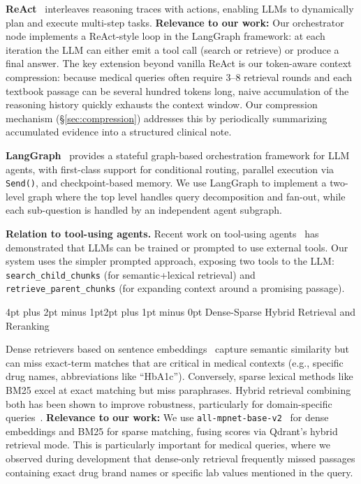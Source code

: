 \documentclass[10pt,twocolumn,letterpaper]{article}
\makeatletter
\renewcommand\subsection{\@startsection{subsection}{2}{\z@}%
  {4pt plus 2pt minus 1pt}{2pt plus 1pt minus 0pt}%
  {\normalsize\bfseries}}
\makeatother
\begin{document}
\textbf{ReAct}~\cite{yao2023react} interleaves reasoning traces with actions, enabling LLMs to dynamically plan and execute multi-step tasks. \textbf{Relevance to our work:} Our orchestrator node implements a ReAct-style loop in the LangGraph framework: at each iteration the LLM can either emit a tool call (search or retrieve) or produce a final answer. The key extension beyond vanilla ReAct is our token-aware context compression: because medical queries often require 3--8 retrieval rounds and each textbook passage can be several hundred tokens long, naive accumulation of the reasoning history quickly exhausts the context window. Our compression mechanism (\S\ref{sec:compression}) addresses this by periodically summarizing accumulated evidence into a structured clinical note.

\textbf{LangGraph}~\cite{langgraph} provides a stateful graph-based orchestration framework for LLM agents, with first-class support for conditional routing, parallel execution via \texttt{Send()}, and checkpoint-based memory. We use LangGraph to implement a two-level graph where the top level handles query decomposition and fan-out, while each sub-question is handled by an independent agent subgraph.

\textbf{Relation to tool-using agents.} Recent work on tool-using agents~\cite{schick2023toolformer,qin2023toolllm} has demonstrated that LLMs can be trained or prompted to use external tools. Our system uses the simpler prompted approach, exposing two tools to the LLM: \texttt{search\_child\_chunks} (for semantic+lexical retrieval) and \texttt{retrieve\_parent\_chunks} (for expanding context around a promising passage).

\subsection{Dense-Sparse Hybrid Retrieval and Reranking}

Dense retrievers based on sentence embeddings~\cite{reimers2019sentence,karpukhin2020dense} capture semantic similarity but can miss exact-term matches that are critical in medical contexts (e.g., specific drug names, abbreviations like ``HbA1c''). Conversely, sparse lexical methods like BM25 excel at exact matching but miss paraphrases. Hybrid retrieval combining both has been shown to improve robustness, particularly for domain-specific queries~\cite{lin2021pyserini}. \textbf{Relevance to our work:} We use \texttt{all-mpnet-base-v2}~\cite{reimers2019sentence} for dense embeddings and BM25 for sparse matching, fusing scores via Qdrant's hybrid retrieval mode. This is particularly important for medical queries, where we observed during development that dense-only retrieval frequently missed passages containing exact drug brand names or specific lab values mentioned in the query.
\end{document}
